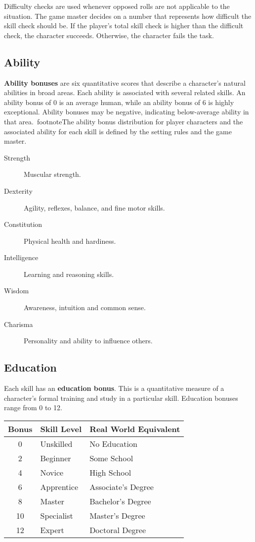 \documentclass[11pt]{article}
\begin{document}
Difficulty checks are used whenever opposed rolls are not applicable to the situation.
The game master decides on a number that represents how difficult the skill check should be.
If the player's total skill check is higher than the difficult check, the character succeeds.
Otherwise, the character fails the task.

\subsection{Ability}
\textbf{Ability bonuses} are six quantitative scores that describe a character's natural abilities in broad areas.
Each ability is associated with several related skills. An ability bonus of 0 is an average human, while an ability bonus of 6 is highly exceptional.
Ability bonuses may be negative, indicating below-average ability in that area.\
footnote{The ability bonus distribution for player characters and the associated ability for each skill is defined by the setting rules and the game master.}

\begin{description}
	\item[Strength]Muscular strength.
	\item[Dexterity]Agility, reflexes, balance, and fine motor skills.
	\item[Constitution]Physical health and hardiness.
	\item[Intelligence]Learning and reasoning skills.
	\item[Wisdom]Awareness, intuition and common sense.
	\item[Charisma]Personality and ability to influence others.
\end{description}

\subsection{Education}
Each skill has an \textbf{education bonus}.
This is a quantitative measure of a character's formal training and study in a particular skill.
Education bonuses range from 0 to 12.

\begin{center}
	\begin{tabular}{cll}
		Bonus & Skill Level & Real World Equivalent  \\
		\hline
		0     & Unskilled   & No Education           \\
		2     & Beginner    & Some School            \\
		4     & Novice      & High School            \\
		6     & Apprentice  & Associate's Degree     \\
		8     & Master      & Bachelor's Degree      \\
		10    & Specialist  & Master's Degree        \\
		12    & Expert      & Doctoral Degree        \\
	\end{tabular}
\end{center}
\end{document}
